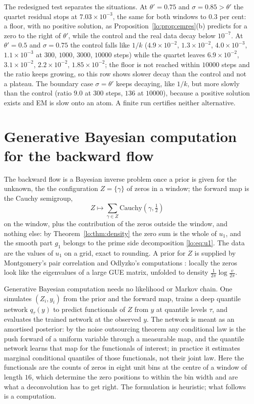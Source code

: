 \begin{resultpar}\label{lo:res:inject}The redesigned test separates the situations. At $\theta'=0.75$ and $\sigma=0.85>\theta'$ the quartet residual stops at $7.03\times10^{-3}$, the same for both windows to $0.3$ per cent: a floor, with no positive solution, as Proposition~\ref{lo:prop:emres}(b) predicts for a zero to the right of $\theta'$, while the control and the real data decay below $10^{-7}$. At $\theta'=0.5$ and $\sigma=0.75$ the control falls like $1/k$ ($4.9\times10^{-2}$, $1.3\times10^{-2}$, $4.0\times10^{-3}$, $1.1\times10^{-3}$ at $300$, $1000$, $3000$, $10000$ steps) while the quartet leaves $6.9\times10^{-2}$, $3.1\times10^{-2}$, $2.2\times10^{-2}$, $1.85\times10^{-2}$; the floor is not reached within $10000$ steps and the ratio keeps growing, so this row shows slower decay than the control and not a plateau. The boundary case $\sigma=\theta'$ keeps decaying, like $1/k$, but more slowly than the control (ratio $9.0$ at $300$ steps, $136$ at $10000$), because a positive solution exists and EM is slow onto an atom. A finite run certifies neither alternative.\end{resultpar}

\section{Generative Bayesian computation for the backward flow}\label{lo:sec:gbc}

The backward flow is a Bayesian inverse problem once a prior is given for the unknown, the the configuration $Z=\{\gamma\}$ of zeros in a window; the forward map is the Cauchy semigroup,
\[
Z\mapsto\sum_{\gamma\in Z}\mathrm{Cauchy}(\gamma,\tfrac12)
\]
on the window, plus the contribution of the zeros outside the window, and nothing else: by Theorem~\ref{lo:thm:density} the zero sum is the whole of $u_1$, and the smooth part $g_1$ belongs to the prime side decomposition \eqref{lo:eq:u1}. The data are the values of $u_1$ on a grid, exact to rounding. A prior for $Z$ is supplied by Montgomery's pair correlation \cite{Montgomery73} and Odlyzko's computations \cite{Odlyzko87}: locally the zeros look like the eigenvalues of a large GUE matrix, unfolded to density $\frac1{2\pi}\log\frac{v}{2\pi}$.

Generative Bayesian computation \cite{PS23,PSGBC26} needs no likelihood or Markov chain. One simulates $(Z_i,y_i)$ from the prior and the forward map, trains a deep quantile network $q_\tau(y)$ to predict functionals of $Z$ from $y$ at quantile levels $\tau$, and evaluates the trained network at the observed $y$. The network is meant as an amortised posterior: by the noise outsourcing theorem \cite{Kallenberg02} any conditional law is the push forward of a uniform variable through a measurable map, and the quantile network learns that map for the functionals of interest; in practice it estimates marginal conditional quantiles of those functionals, not their joint law. Here the functionals are the counts of zeros in eight unit bins at the centre of a window of length $16$, which determine the zero positions to within the bin width and are what a deconvolution has to get right. The formulation is heuristic; what follows is a computation.

